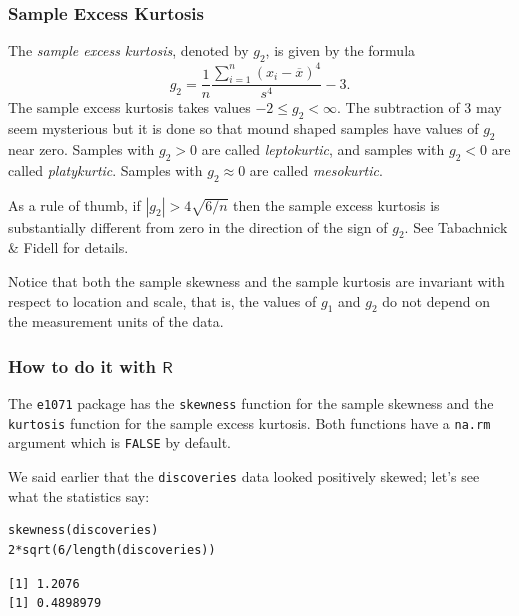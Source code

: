 \documentclass[10pt,english]{scrbook}
\begin{document}
\subsubsection[Sample Excess Kurtosis]{Sample Excess Kurtosis}
\label{sec-1-3-5-2}

The \emph{sample excess kurtosis}, denoted by \(g_{2}\), is given by the formula
\begin{equation}
g_{2}=\frac{1}{n}\frac{\sum_{i=1}^{n}(x_{i}-\overline{x})^{4}}{s^{4}}-3.
\end{equation}
The sample excess kurtosis takes values \(-2\leq g_{2}<\infty\). The subtraction of 3 may seem mysterious but it is done so that mound shaped samples have values of \(g_{2}\) near zero. Samples with \(g_{2}>0\) are called \emph{leptokurtic}, and samples with \(g_{2}<0\) are called \emph{platykurtic}. Samples with \(g_{2}\approx0\) are called \emph{mesokurtic}.

As a rule of thumb, if \(|g_{2}|>4\sqrt{6/n}\) then the sample excess kurtosis is substantially different from zero in the direction of the sign of \(g_{2}\). See Tabachnick \& Fidell \cite{Tabachnick2006} for details.

Notice that both the sample skewness and the sample kurtosis are invariant with respect to location and scale, that is, the values of \(g_{1}\) and \(g_{2}\) do not depend on the measurement units of the data. 
\subsubsection[How to do it with \(\mathsf{R}\)]{How to do it with \(\mathsf{R}\)}
\label{sec-1-3-5-3}

The \texttt{e1071} package \cite{e1071} has the \texttt{skewness} function for the sample skewness and the \texttt{kurtosis} function for the sample excess kurtosis. Both functions have a \texttt{na.rm} argument which is \texttt{FALSE} by default.

\begin{exampletoo}
We said earlier that the \texttt{discoveries} data looked positively skewed; let's see what the statistics say:
\end{exampletoo}

\begin{verbatim}
skewness(discoveries)
2*sqrt(6/length(discoveries))
\end{verbatim}

\begin{verbatim}
[1] 1.2076
[1] 0.4898979
\end{verbatim}
\end{document}

